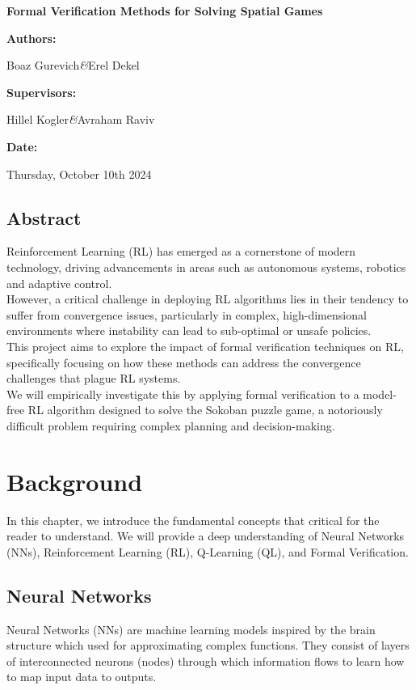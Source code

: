 \documentclass[12pt,a4paper]{report}
\newcommand{\projectname}{Formal Verification Methods for Solving Spatial Games}
\newcommand{\firstauthor}{Boaz Gurevich}
\newcommand{\secondauthor}{Erel Dekel}
\newcommand{\firstsupervisor}{Hillel Kogler}
\newcommand{\secondsupervisor}{Avraham Raviv}
\newcommand{\submissiondate}{Thursday, October 10th 2024}
\renewcommand{\maketitle}{
    \begin{titlepage}
        \centering
        \vspace*{2cm}
        
        {\huge\bfseries\projectname\par}
        \vspace{1.5cm}
        
        {\large\textbf{Authors:}\par}
        \vspace{0.5cm}
        {\large\firstauthor\hspace{0.3cm}\textit{\&}\hspace{0.3cm}\secondauthor\par}
        
        \vspace{2cm}
        
        {\large\textbf{Supervisors:}\par}
        \vspace{0.5cm}
        {\large\firstsupervisor\hspace{0.3cm}\textit{\&}\hspace{0.3cm}\secondsupervisor\par}
        
        \vspace{2cm}

        {\large\textbf{Date:}\par}
        \vspace{0.5cm}
        {\large\submissiondate\par}
    \end{titlepage}
}
\begin{document}
\hypersetup{
    linkcolor=blue,
    urlcolor=blue,
    linktoc=all
}

\maketitle

\section*{Abstract}
Reinforcement Learning (RL) has emerged as a cornerstone of modern technology, driving advancements in areas such as autonomous systems, robotics and adaptive control.\\
However, a critical challenge in deploying RL algorithms lies in their tendency to suffer from convergence issues, particularly in complex, high-dimensional environments where instability can lead to sub-optimal or unsafe policies.\\
This project aims to explore the impact of formal verification techniques on RL, specifically focusing on how these methods can address the convergence challenges that plague RL systems.\\
We will empirically investigate this by applying formal verification to a model-free RL algorithm designed to solve the Sokoban puzzle game, a notoriously difficult problem requiring complex planning and decision-making.\\

\tableofcontents

\chapter{Background}
In this chapter, we introduce the fundamental concepts that critical for the reader to understand.
We will provide a deep understanding of Neural Networks (NNs), Reinforcement Learning (RL), Q-Learning (QL), and Formal Verification.
\section{Neural Networks}
Neural Networks (NNs) are machine learning models inspired by the brain structure which used for approximating complex functions. They consist of layers of interconnected neurons (nodes) through which information flows to learn how to map input data to outputs.
\end{document}
